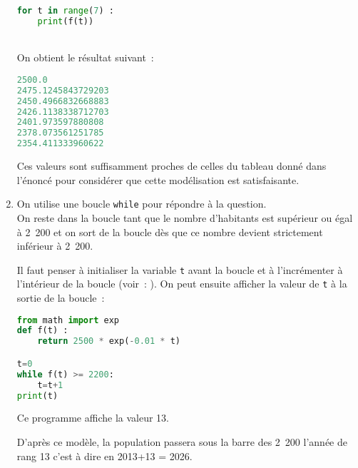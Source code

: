\begin{corrige}
\begin{enumerate}
\begin{lstlisting}[language=Python]
for t in range(7) : 
    print(f(t))
\end{lstlisting}
\par
\\
On obtient le résultat suivant~:
\begin{lstlisting}[language=Python]
2500.0
2475.1245843729203
2450.4966832668883
2426.1138338712703
2401.973597880808
2378.073561251785
2354.411333960622
\end{lstlisting}
\par
Ces valeurs sont suffisamment proches de celles du tableau donné dans l'énoncé pour considérer que cette modélisation est satisfaisante.
\item
On utilise une boucle \texttt{while} pour répondre à la question.
\\On reste dans la boucle tant que le nombre d'habitants est supérieur ou égal à 2~200 et on sort de la boucle dès que ce nombre devient strictement inférieur à 2~200.
\par
Il faut penser à initialiser la variable \texttt{t} avant la boucle et à l’incrémenter à l'intérieur de la boucle (voir~: ). On peut ensuite afficher la valeur de \texttt{t} à la sortie de la boucle~:
\begin{lstlisting}[language=Python]
from math import exp
def f(t) :
    return 2500 * exp(-0.01 * t)

t=0
while f(t) >= 2200: 
    t=t+1
print(t)
\end{lstlisting}
\par
Ce programme affiche la valeur 13.
\par
D'après ce modèle, la population passera sous la barre des 2~200 l'année de rang 13 c'est à dire en 2013+13 = 2026.
\end{enumerate}
\end{corrige}
